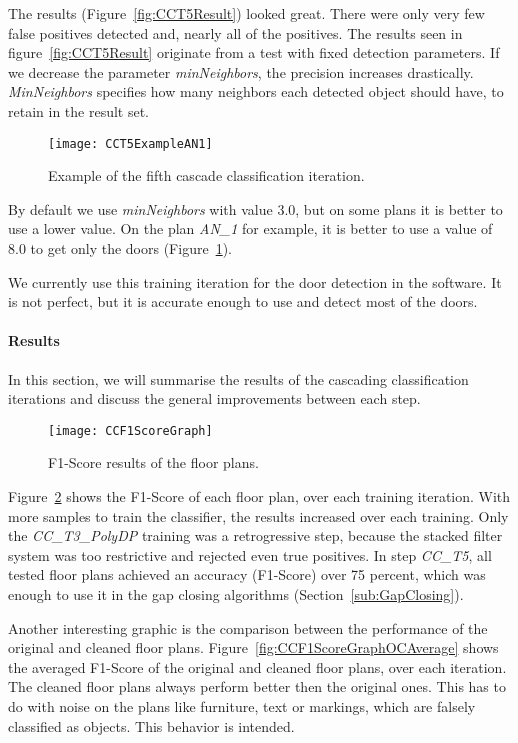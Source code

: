 The results (Figure~\ref{fig:CCT5Result}) looked great. There were only very few false positives detected and, nearly all of the positives. The results seen in figure~\ref{fig:CCT5Result} originate from a test with fixed detection parameters. If we decrease the parameter \textit{minNeighbors}, the precision increases drastically. \textit{MinNeighbors} specifies how many neighbors each detected object should have, to retain in the result set.

\begin{figure}[H]
	\centering
	\texttt{[image: CCT5ExampleAN1]}
	\caption{Example of the fifth cascade classification iteration.}
	\label{fig:CCT5ExampleAN1}
\end{figure}

By default we use \textit{minNeighbors} with value $3.0$, but on some plans it is better to use a lower value. On the plan \textit{AN\_1} for example, it is better to use a value of 8.0 to get only the doors (Figure~\ref{fig:CCT5ExampleAN1}).

We currently use this training iteration for the door detection in the software. It is not perfect, but it is accurate enough to use and detect most of the doors.

\paragraph{Results}
\label{sec:ResultsCascade}
In this section, we will summarise the results of the cascading classification iterations and discuss the general improvements between each step.

\begin{figure}[H]
	\centering
	\texttt{[image: CCF1ScoreGraph]}
	\caption{F1-Score results of the floor plans.}
	\label{fig:CCF1ScoreGraph}
\end{figure}

Figure~\ref{fig:CCF1ScoreGraph} shows the F1-Score of each floor plan, over each training iteration. With more samples to train the classifier, the results increased over each training. Only the \textit{CC\_T3\_PolyDP} training was a retrogressive step, because the stacked filter system was too restrictive and rejected even true positives. In step \textit{CC\_T5}, all tested floor plans achieved an accuracy (F1-Score) over 75 percent, which was enough to use it in the gap closing algorithms (Section~\ref{sub:GapClosing}).

Another interesting graphic is the comparison between the performance of the original and cleaned floor plans. Figure~\ref{fig:CCF1ScoreGraphOCAverage} shows the averaged F1-Score of the original and cleaned floor plans, over each iteration. The cleaned floor plans always perform better then the original ones. This has to do with noise on the plans like furniture, text or markings, which are falsely classified as objects. This behavior is intended.

